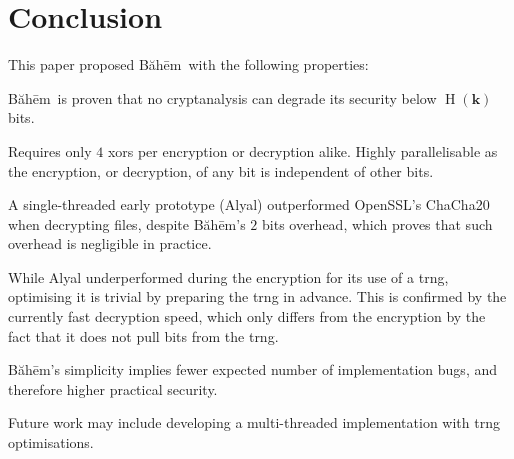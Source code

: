 \documentclass[twocolumn]{article}
\newcommand{\baheem}{Băhēm}
\DeclareMathOperator{\entropy}{H}
\begin{document}
\section{Conclusion}
This paper proposed \baheem\ with the following properties:
\begin{description}[itemsep=0em]
    \item[Secure.] \baheem\ is proven that no cryptanalysis can degrade its
        security below $\entropy(\mathbf{k})$ bits.
    \item[Fast.] Requires only $4$ \glspl{xor} per encryption or decryption
        alike.  Highly parallelisable as the encryption, or decryption, of
        any bit is independent of other bits.

        A single-threaded early prototype (Alyal) outperformed OpenSSL's
        ChaCha20 when decrypting files, despite \baheem's $2$ bits
        overhead, which proves that such overhead is negligible in
        practice.

        While Alyal underperformed during the encryption for its use of a
        \gls{trng}, optimising it is trivial by preparing the \gls{trng} in
        advance.  This is confirmed by the currently fast decryption speed,
        which only differs from the encryption by the fact that it does not
        pull bits from the \gls{trng}.
    \item[Simple.] \baheem's simplicity implies fewer expected number of
        implementation bugs, and therefore higher practical security.
\end{description}

Future work may include developing a multi-threaded implementation with
\gls{trng} optimisations.



\end{document}

